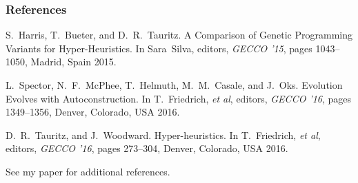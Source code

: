 \documentclass{beamer}
\begin{document}
\begin{frame} 
	\frametitle{References}
	
	\begin{thebibliography}{lskdjf}
		
		S.~Harris, T.~Bueter, and D.~R.~Tauritz.
		\newblock A Comparison of Genetic Programming Variants for Hyper-Heuristics.
		\newblock In Sara~Silva, editors, {\em GECCO '15}, pages 1043--1050, Madrid, Spain 2015.
		
		L.~Spector, N.~F.~McPhee, T.~Helmuth, M.~M.~Casale, and J.~Oks.
		\newblock Evolution Evolves with Autoconstruction.
		\newblock In T.~Friedrich, \emph{et al}, editors, {\em GECCO '16}, pages 1349--1356, Denver, Colorado, USA 2016.
		
		D.~R.~Tauritz, and J.~Woodward.
		\newblock Hyper-heuristics.
		\newblock In T.~Friedrich, \emph{et al}, editors, {\em GECCO '16}, pages 273--304, Denver, Colorado, USA 2016.
		
	\end{thebibliography}
	\begin{center}
		See my paper for additional references.
	\end{center}
\end{frame}
\end{document}

